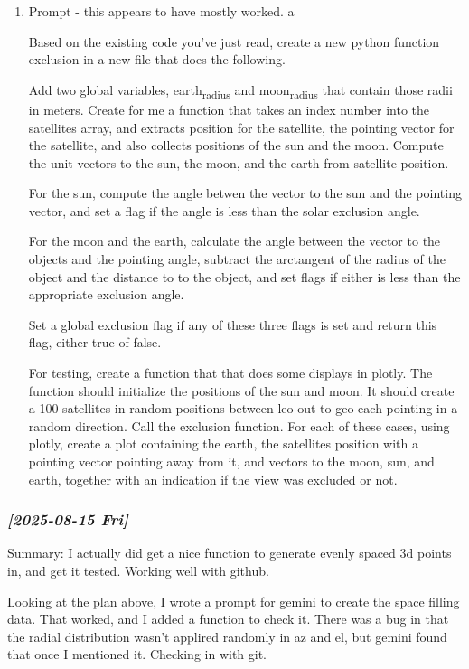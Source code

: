 \documentclass[11pt]{article}
\begin{document}
\begin{enumerate}
\item Prompt - this appears to have mostly worked. a
\label{sec:org2a84c01}

Based on the existing code you've just read, create a new
python function exclusion  in a new file that does the following.

Add two global variables, earth\textsubscript{radius} and moon\textsubscript{radius} that contain
those radii in meters.
Create for me a function that takes an index number into the satellites
array, and extracts position for the satellite, the pointing
vector for the satellite, and also collects positions of the sun
and the moon.
Compute the unit vectors to the sun, the moon, and the earth from
satellite position.

For the sun, compute the angle betwen the vector to the sun and
the pointing vector, and set a flag if the angle is less than
the solar exclusion angle.

For the moon and the earth, calculate the angle between the
vector to the objects and the pointing angle, subtract
the arctangent of the  radius of the object and the distance to
to the object, and set flags if either is less than the
appropriate exclusion angle.

Set a global exclusion flag if any of these three flags is
set and return this flag, either true of false.


For testing, create a function that that does some displays in
plotly.  The function should initialize the positions of the
sun and moon.  It should create a 100 satellites in random
positions between leo out to geo each pointing in a random
direction. Call the exclusion function.  For each of these
cases, using plotly, create a plot containing the earth,
the satellites position with a pointing vector pointing away
from it, and vectors to the moon, sun, and earth, together with
an indication if the view was excluded or not.
\end{enumerate}


\subsubsection{\textit{[2025-08-15 Fri]}}
\label{sec:orgeecfddc}

Summary:  I actually did get a nice function to generate evenly
spaced 3d points in, and get it tested.  Working well with github.


Looking at the plan above, I wrote a prompt for gemini to create
the space filling data.
That worked, and I added a function to check it.  There
was a bug in that the radial distribution wasn't applired randomly
in az and el, but gemini found that once I mentioned it.
Checking in with git.
\end{document}
